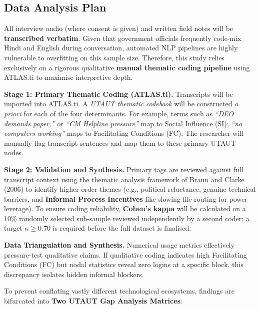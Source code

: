 \documentclass[11pt,a4paper]{article}
\begin{document}
\subsection{Data Analysis Plan}

All interview audio (where consent is given) and written field notes will be
\textbf{transcribed verbatim}. Given that government officials frequently 
code-mix Hindi and English during conversation, automated NLP pipelines are highly 
vulnerable to overfitting on this sample size. Therefore, this study relies 
exclusively on a rigorous qualitative \textbf{manual thematic coding pipeline} using 
ATLAS.ti to maximise interpretive depth.

\medskip
\noindent\textbf{Stage 1: Primary Thematic Coding (ATLAS.ti).}
Transcripts will be imported into ATLAS.ti. A \textit{UTAUT thematic codebook} will
be constructed \textit{a priori} for each of the four determinants. For example,
terms such as \textit{``DEO demands paper,''} or \textit{``CM Helpline pressure''}
map to Social Influence (SI); \textit{``no computers working''} maps to Facilitating 
Conditions (FC). The researcher will manually flag transcript sentences and map them 
to these primary UTAUT nodes.

\medskip
\noindent\textbf{Stage 2: Validation and Synthesis.}
Primary tags are reviewed against full transcript context using the thematic
analysis framework of Braun and Clarke (2006) to identify higher-order themes 
(e.g., political reluctance, genuine technical barriers, and \textbf{Informal Process Incentives} 
like slowing file routing for power leverage). To ensure
coding reliability, \textbf{Cohen's kappa} will be calculated on a 10\% randomly
selected sub-sample reviewed independently by a second coder; a target $\kappa \geq
0.70$ is required before the full dataset is finalised.

\medskip
\noindent\textbf{Data Triangulation and Synthesis.}
Numerical usage metrics effectively pressure-test qualitative claims. If qualitative 
coding indicates high Facilitating Conditions (FC) but nodal statistics reveal zero 
logins at a specific block, this discrepancy isolates hidden informal blockers.

To prevent conflating vastly different technological ecosystems, findings are bifurcated into \textbf{Two UTAUT Gap Analysis Matrices}:
\end{document}
